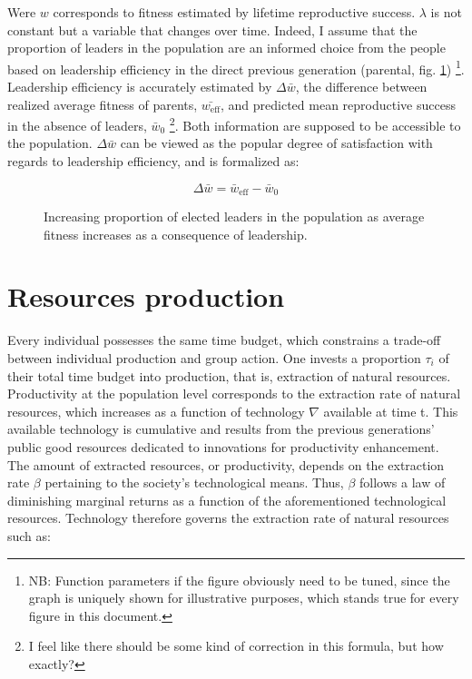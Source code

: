 \documentclass[a4paper]{article}
\begin{document}
Were $w$ corresponds to fitness estimated by lifetime reproductive success. $\lambda$ is not constant but a variable that changes over time. Indeed, I assume that the proportion of leaders in the population are an informed choice from the people based on leadership efficiency in the direct previous generation (parental, fig. \ref{fig:lambda}) \footnote{NB: Function parameters if the figure obviously need to be tuned, since the graph is uniquely shown for illustrative purposes, which stands true for every figure in this document.}. Leadership efficiency is accurately estimated by $\Delta\bar{w}$, the difference between realized average fitness of parents, $\bar{w_\text{eff}}$, and predicted mean reproductive success in the absence of leaders, $\bar{w}_0$ \footnote{I feel like there should be some kind of correction in this formula, but how exactly?}. Both information are supposed to be accessible to the population. $\Delta\bar{w}$ can be viewed as the popular degree of satisfaction with regards to leadership efficiency, and is formalized as:

\begin{equation}
	\Delta\bar{w}=\bar{w}_\text{eff}-\bar{w}_0
\end{equation}   

\begin{figure}[!htbp]
	\begin{center}
	\end{center}
	\caption{Increasing proportion of elected leaders in the population as average fitness increases as a consequence of leadership.}
	\label{fig:lambda}
\end{figure} 

\section{Resources production}
\label{sec:prod}

Every individual possesses the same time budget, which constrains a trade-off between individual production and group action. One invests a proportion $\tau_i$ of their total time budget into production, that is, extraction of natural resources. Productivity at the population level corresponds to the extraction rate of natural resources, which increases as a function of technology $\nabla$ available at time t. This available technology is cumulative and results from the previous generations' public good resources dedicated to innovations for productivity enhancement. The amount of extracted resources, or productivity, depends on the extraction rate $\beta$ pertaining to the society's technological means. Thus, $\beta$ follows a law of diminishing marginal returns as a function of the aforementioned technological resources. Technology therefore governs the extraction rate of natural resources such as:
\end{document}
